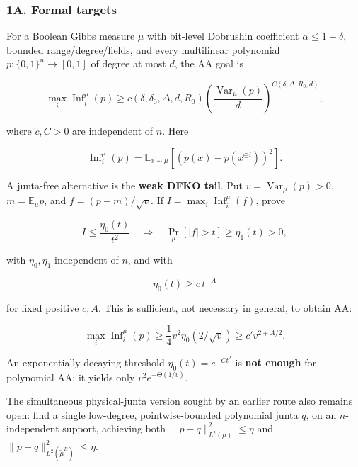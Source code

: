 \subsubsection{1A. Formal targets}\label{a.-formal-targets}

For a Boolean Gibbs measure \(\mu\) with bit-level Dobrushin coefficient \(\alpha\le1-\delta\), bounded range/degree/fields, and every multilinear polynomial \(p:\{0,1\}^n\to[0,1]\) of degree at most \(d\), the AA goal is

\[
\max_i\operatorname{Inf}_i^\mu(p)
\ge c(\delta,\delta_0,\Delta,d,R_0)
\left(\frac{\operatorname{Var}_\mu(p)}d\right)^{C(\delta,\Delta,R_0,d)},
\]

where \(c,C>0\) are independent of \(n\). Here

\[\operatorname{Inf}_i^\mu(p)=\mathbb E_{x\sim\mu}[(p(x)-p(x^{\oplus i}))^2].\]

A junta-free alternative is the \textbf{weak DFKO tail}. Put \(v=\operatorname{Var}_\mu(p)>0\), \(m=\mathbb E_\mu p\), and \(f=(p-m)/\sqrt v\). If \(I=\max_i\operatorname{Inf}_i^\mu(f)\), prove

\[I\le\frac{\eta_0(t)}{t^2}
\quad\Longrightarrow\quad
\Pr_\mu[|f|>t]\ge\eta_1(t)>0,\]

with \(\eta_0,\eta_1\) independent of \(n\), and with

\[\eta_0(t)\ge c\,t^{-A}\]

for fixed positive \(c,A\). This is sufficient, not necessary in general, to obtain AA:

\[\max_i\operatorname{Inf}_i^\mu(p)
\ge \frac14v^2\eta_0(2/\sqrt v)
\ge c'v^{2+A/2}.\]

An exponentially decaying threshold \(\eta_0(t)=e^{-Ct^2}\) is \textbf{not enough} for polynomial AA: it yields only \(v^2e^{-\Theta(1/v)}\).

The simultaneous physical-junta version sought by an earlier route also remains open: find a single low-degree, pointwise-bounded polynomial junta \(q\), on an \(n\)-independent support, achieving both \(\|p-q\|_{L^2(\mu)}^2\le\eta\) and \(\|p-q\|_{L^2(\widetilde{\mu}^R)}^2\le\eta\).
